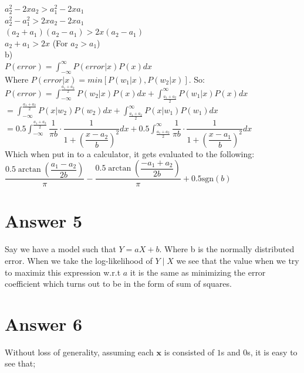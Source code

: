 \documentclass[12pt]{article}
\begin{document}
$a_2^2-2xa_2>a_1^2-2xa_1$\\

$a_2^2-a_1^2>2xa_2-2xa_1$ \\

$(a_2+a_1)(a_2-a_1)  > 2x (a_2-a_1)$ \\

$a_2+a_1>2x$ (For $a_2>a_1$) \\

b) \\

$P(error) =\displaystyle\int_{-\infty}^{\infty}P(error|x)P(x)dx$ \\

Where $P(error|x) = min[P(w_1|x),P(w_2|x)]$. So:\\

$P(error) =\displaystyle\int_{-\infty}^{ \frac{a_1+a_2}{2} }P(w_2|x)P(x)dx + \int_{ \frac{a_1+a_2}{2}  }^{ \infty }P(w_1|x)P(x)dx $ \\

$ =\displaystyle\int_{-\infty}^{ \frac{a_1+a_2}{2} }P(x|w_2)P(w_2)dx + \int_{ \frac{a_1+a_2}{2}  }^{ \infty }P(x|w_1)P(w_1)dx $ \\
 

$ =0.5\displaystyle\int_{-\infty}^{ \frac{a_1+a_2}{2} }\dfrac{1}{\pi b}\cdot \dfrac{1}{1+(\dfrac{x-a_2}{b})^2}dx + 0.5\int_{ \frac{a_1+a_2}{2}  }^{ \infty }\dfrac{1}{\pi b}\cdot \dfrac{1}{1+(\dfrac{x-a_1}{b})^2}dx $ \\


Which when put in to a calculator, it gets evaluated to the following: \\

$\dfrac{0.5\arctan \left(\dfrac{a_1-a_2}{2b}\right)}{\pi }-\dfrac{0.5\arctan \left(\dfrac{-a_1+a_2}{2b}\right)}{\pi }+0.5\text{sgn}\left(b\right)$



\section*{Answer 5}

Say we have a model such that $Y=aX+b$. Where b is the normally distributed error. When we take the log-likelihood of $Y\mid X$ we see that the value when we try to maximiz this expression w.r.t $a$ it is the same as minimizing the error coefficient which turns out to be in the form of sum of squares.

\section*{Answer 6}
Without loss of generality, assuming each $\boldsymbol{x}$ is consisted of $1$s and $0$s, it is easy to see that;\\
\end{document}
